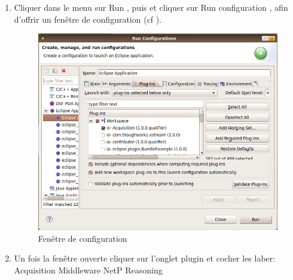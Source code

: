 \begin{enumerate}
 \item Cliquer dans le menu sur \og Run \fg, puis et cliquer sur \og Run configuration \fg, 
afin d'offrir un fenêtre de configuration (cf\label{fig:fenetreConfg} ).
  \begin{figure}
	  \centering
	  \includegraphics[scale=0.50]{img/tuto}
	  \caption{Fenêtre de configuration}
	  \label{fig:fenetreConfg}
\end{figure}

  \item Un fois la fenêtre ouverte cliquer sur l'onglet plugin et cocher les laber:
      \subitem Acquisition
      \subitem Middleware
      \subitem NetP
      \subitem Reasoning
\end{enumerate}


